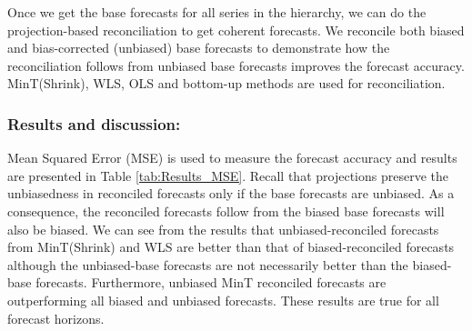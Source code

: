 \documentclass[12pt]{article}
\theoremstyle{definition}
\theoremstyle{property}
\begin{document}
	Once we get the base forecasts for all series in the hierarchy, we can do the projection-based reconciliation to get coherent forecasts. We reconcile both biased and bias-corrected (unbiased) base forecasts to demonstrate how the reconciliation follows from unbiased base forecasts improves the forecast accuracy. MinT(Shrink), WLS, OLS and bottom-up methods are used for reconciliation.
	
	\subsubsection*{Results and discussion:}
	
	Mean Squared Error (MSE) is used to measure the forecast accuracy and results are presented in Table \ref{tab:Results_MSE}. Recall that projections preserve the unbiasedness in reconciled forecasts only if the base forecasts are unbiased. As a consequence, the reconciled forecasts follow from the biased base forecasts will also be biased. We can see from the results that unbiased-reconciled forecasts from MinT(Shrink) and WLS are better than that of biased-reconciled forecasts although the unbiased-base forecasts are not necessarily better than the biased-base forecasts. Furthermore, unbiased MinT reconciled forecasts are outperforming all biased and unbiased forecasts. These results are true for all forecast horizons. 
	
\end{document}
